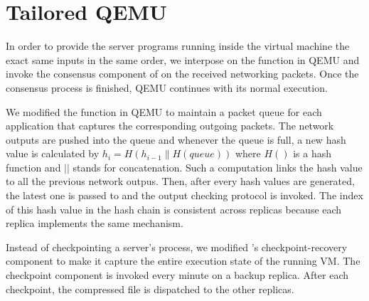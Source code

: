 \section{Tailored QEMU} \label{sec:qemu}

In order to provide the server programs running inside the virtual machine the exact same 
inputs in the same order, we interpose on the \tapsend function in QEMU and invoke the 
\paxos consensus component of \smrsystem on the received networking packets. Once the 
consensus process is finished, QEMU continues with its normal execution. 

We modified the \taprecv function in QEMU to maintain a packet queue for each application 
that captures the corresponding outgoing packets. The network outputs are pushed into the 
queue and whenever the queue is full, a new hash value is calculated by 
$h_i=H(h_{i-1}\|H(queue))$ where $H()$ is a hash function and $||$ stands for concatenation. 
Such a computation links the hash value to all the previous network outpus. Then, after every 
\thashcomp hash values are generated, the latest one is passed to \smrsystem and the output 
checking protocol is invoked. The index of this hash value in the hash chain is 
consistent across replicas because each replica implements the same mechanism. 


Instead of checkpointing a server's process, we modified \smrsystem's checkpoint-recovery 
component to make it capture the entire execution state of the running VM. The checkpoint 
component is invoked every minute on a backup replica. After each checkpoint, the compressed 
file is dispatched to the other replicas. 
